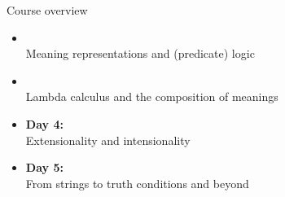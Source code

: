\documentclass[xcolor=dvipsnames]{beamer}
\begin{document}
%


\begin{frame}{Course overview}

\begin{itemize}
\item[] {\color{CWIgrey}{\bf Day 2:}\\ Meaning representations and (predicate) logic}
\item[] {\color{CWIgrey}{\bf Day 3:}\\ Lambda calculus and the composition of meanings}
\item {\bf Day 4:}\\ Extensionality and intensionality
\item {\bf Day 5:}\\ From strings to truth conditions and beyond
\end{itemize}
\end{frame}
\end{document}
